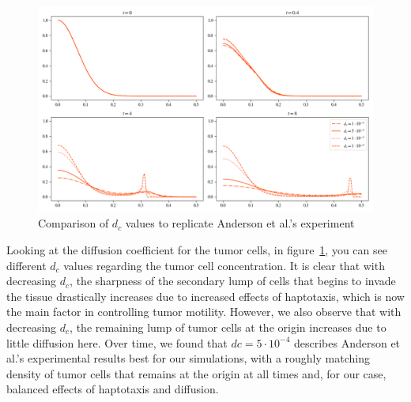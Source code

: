 \begin{figure}[!htb]
 \centering
 \includegraphics[width=\textwidth]{resources/images/dc_comparison.png}
 \caption{Comparison of $d_c$ values to replicate Anderson et al.'s experiment}
 \label{fig:replication_dc_comparison}
\end{figure}
Looking at the diffusion coefficient for the tumor cells, in figure~\ref{fig:replication_dc_comparison}, you can see different $d_c$ values regarding the tumor cell concentration. It is clear that with decreasing $d_c$, the sharpness of the secondary lump of cells that begins to invade the tissue drastically increases due to increased effects of haptotaxis, which is now the main factor in controlling tumor motility. However, we also observe that with decreasing $d_c$, the remaining lump of tumor cells at the origin increases due to little diffusion here. Over time, we found that $dc=5 \cdot 10^{-4}$ describes Anderson et al.'s experimental results best for our simulations, with a roughly matching density of tumor cells that remains at the origin at all times and, for our case, balanced effects of haptotaxis and diffusion.

